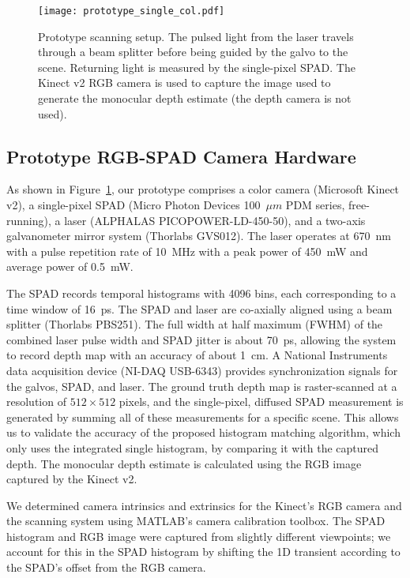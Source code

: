 \begin{figure}[t!]
	\centering
  \texttt{[image: prototype\_single\_col.pdf]}
  \caption{Prototype scanning setup. The pulsed light from the laser travels
    through a beam splitter before being guided by the galvo to the scene.
    Returning light is measured by the single-pixel SPAD. The Kinect v2 RGB 
    camera is used to capture the image used to generate the monocular depth estimate
    (the depth camera is not used).}
  \label{fig:prototype}
\end{figure}

\subsection{Prototype RGB-SPAD Camera Hardware}


As shown in Figure~\ref{fig:prototype}, our prototype comprises a color camera (Microsoft Kinect v2), a single-pixel SPAD (Micro Photon Devices 100~$\mu m$ PDM series, free-running), a laser (ALPHALAS PICOPOWER-LD-450-50), and a two-axis galvanometer mirror system (Thorlabs GVS012). The laser operates at 670~nm with a pulse repetition rate of 10~MHz with a peak power of 450~mW and average power of 0.5~mW. 

The SPAD records temporal histograms with 4096 bins, each corresponding to a time window of 16~ps. The SPAD and laser are co-axially aligned using a beam splitter (Thorlabs PBS251). The full width at half maximum (FWHM) of the combined laser pulse width and SPAD jitter is about 70~ps, allowing the system to record depth map with an accuracy of about 1~cm. A National Instruments data acquisition device (NI-DAQ USB-6343) provides synchronization signals for the galvos, SPAD, and laser. The ground truth depth map is raster-scanned at a resolution of $512 \times 512$ pixels, and the single-pixel, diffused SPAD measurement is generated by summing all of these measurements for a specific scene. This allows us to validate the accuracy of the proposed histogram matching algorithm, which only uses the integrated single histogram, by comparing it with the captured depth. The monocular depth estimate is calculated using the RGB image captured by the Kinect v2.

We determined camera intrinsics and extrinsics for the Kinect's RGB camera and
the scanning system using MATLAB's camera calibration toolbox. 
The SPAD histogram and RGB image were captured from slightly different viewpoints; we account for this in the SPAD histogram by shifting the 1D transient according to the SPAD's offset from the RGB camera. 

